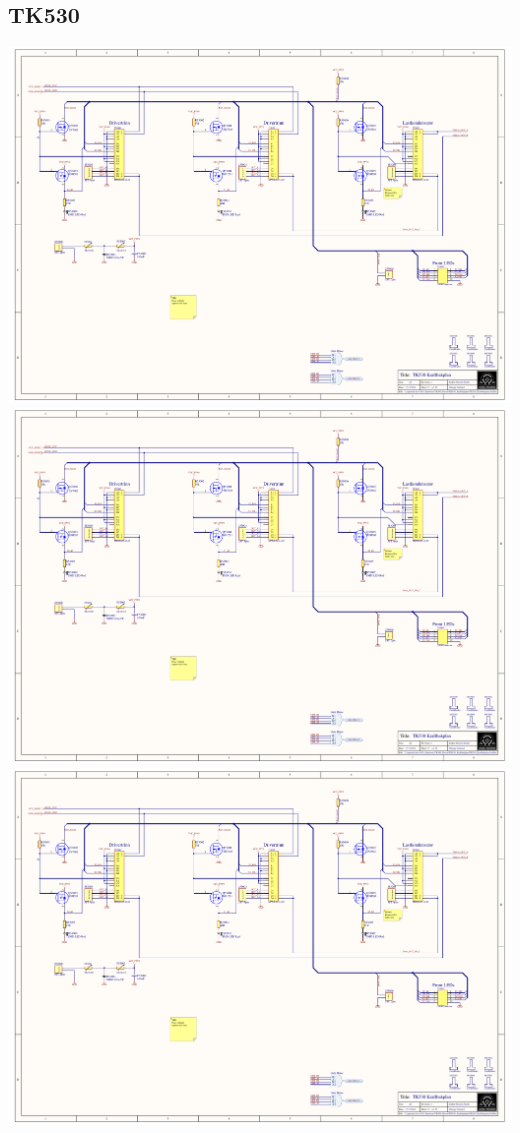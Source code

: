 \subsection{TK530}
\includegraphics[page=4,angle=270,height=\textheight,width=\textwidth,keepaspectratio]{TK530_Kraftbakplan.PDF}
\includegraphics[page=5,angle=270,height=\textheight,width=\textwidth,keepaspectratio]{TK530_Kraftbakplan.PDF}
\includegraphics[page=6,angle=270,height=\textheight,width=\textwidth,keepaspectratio]{TK530_Kraftbakplan.PDF}
